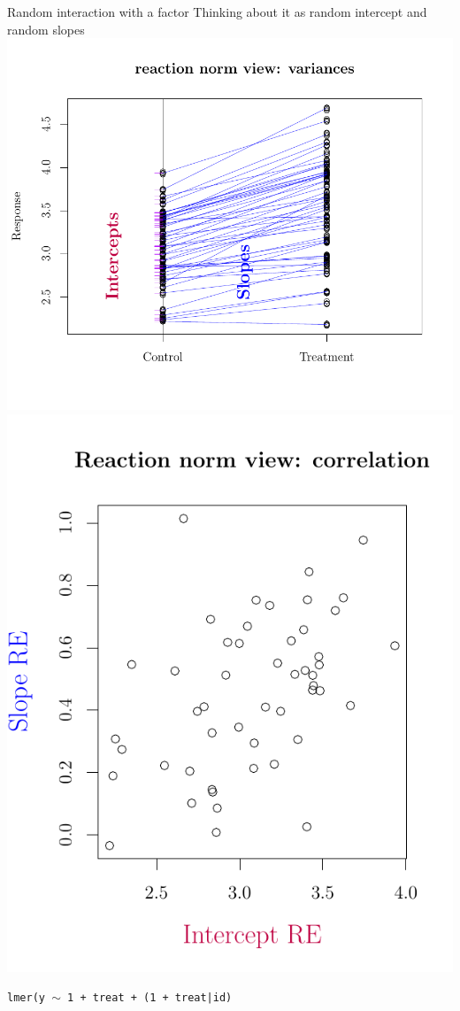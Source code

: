 \documentclass{beamer}
\begin{document}
\begin{frame}{Random interaction with a factor}
 Thinking about it as random intercept and random slopes
 \centering
 \includegraphics[height=0.6\textheight]{figure/reacnorm1-1}
 \includegraphics[height=0.6\textheight]{figure/reacnorm2-1}

 \texttt{lmer(y $\sim$ 1 + treat + (1 + treat|id)}
\end{frame}
\end{document}
